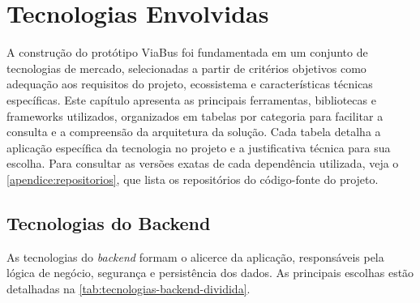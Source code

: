 \chapter{Tecnologias Envolvidas} \label{cha:tecnologias}

A construção do protótipo ViaBus foi fundamentada em um conjunto de tecnologias de mercado, selecionadas a partir de critérios objetivos como adequação aos requisitos do projeto, ecossistema e características técnicas específicas. Este capítulo apresenta as principais ferramentas, bibliotecas e frameworks utilizados, organizados em tabelas por categoria para facilitar a consulta e a compreensão da arquitetura da solução. Cada tabela detalha a aplicação específica da tecnologia no projeto e a justificativa técnica para sua escolha. Para consultar as versões exatas de cada dependência utilizada, veja o \autoref{apendice:repositorios}, que lista os repositórios do código-fonte do projeto.

\section{Tecnologias do Backend}

As tecnologias do \textit{backend} formam o alicerce da aplicação, responsáveis pela lógica de negócio, segurança e persistência dos dados. As principais escolhas estão detalhadas na \autoref{tab:tecnologias-backend-dividida}.

